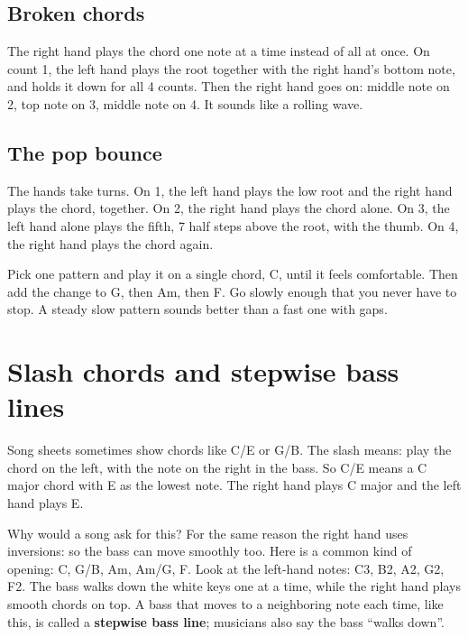 \subsection*{Broken chords}

The right hand plays the chord one note at a time instead of all at once. On count 1, the left hand plays the root together with the right hand's bottom note, and holds it down for all 4 counts. Then the right hand goes on: middle note on 2, top note on 3, middle note on 4. It sounds like a rolling wave. 

\subsection*{The pop bounce}

The hands take turns. On 1, the left hand plays the low root and the right hand plays the chord, together. On 2, the right hand plays the chord alone. On 3, the left hand alone plays the fifth, 7 half steps above the root, with the thumb. On 4, the right hand plays the chord again. 

\begin{tryitbox}
Pick one pattern and play it on a single chord, C, until it feels comfortable. Then add the change to G, then Am, then F. Go slowly enough that you never have to stop. A steady slow pattern sounds better than a fast one with gaps.
\end{tryitbox}

\section{Slash chords and stepwise bass lines}

Song sheets sometimes show chords like C/E or G/B. The slash means: play the chord on the left, with the note on the right in the bass. So C/E means a C major chord with E as the lowest note. The right hand plays C major and the left hand plays E. 

Why would a song ask for this? For the same reason the right hand uses inversions: so the bass can move smoothly too. Here is a common kind of opening: C, G/B, Am, Am/G, F. Look at the left-hand notes: C3, B2, A2, G2, F2. The bass walks down the white keys one at a time, while the right hand plays smooth chords on top. A bass that moves to a neighboring note each time, like this, is called a \textbf{stepwise bass line}; musicians also say the bass ``walks down''. 

